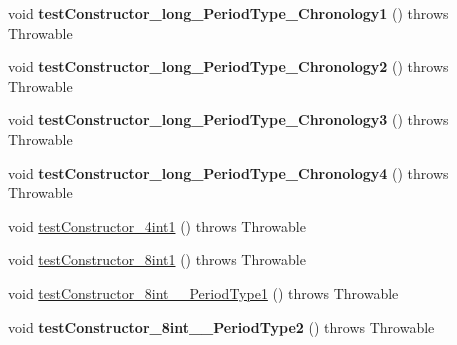 \begin{DoxyCompactItemize}
\item 
\hypertarget{classorg_1_1joda_1_1time_1_1_test_mutable_period___constructors_a5d15c2ef051da7a5cdbb56382c9f3d45}{void {\bfseries test\-Constructor\-\_\-long\-\_\-\-Period\-Type\-\_\-\-Chronology1} ()  throws Throwable }\label{classorg_1_1joda_1_1time_1_1_test_mutable_period___constructors_a5d15c2ef051da7a5cdbb56382c9f3d45}

\item 
\hypertarget{classorg_1_1joda_1_1time_1_1_test_mutable_period___constructors_a62b285c09e2b02371d8b730863ada50f}{void {\bfseries test\-Constructor\-\_\-long\-\_\-\-Period\-Type\-\_\-\-Chronology2} ()  throws Throwable }\label{classorg_1_1joda_1_1time_1_1_test_mutable_period___constructors_a62b285c09e2b02371d8b730863ada50f}

\item 
\hypertarget{classorg_1_1joda_1_1time_1_1_test_mutable_period___constructors_a1eec1e53a847981ecb0475cfd7804625}{void {\bfseries test\-Constructor\-\_\-long\-\_\-\-Period\-Type\-\_\-\-Chronology3} ()  throws Throwable }\label{classorg_1_1joda_1_1time_1_1_test_mutable_period___constructors_a1eec1e53a847981ecb0475cfd7804625}

\item 
\hypertarget{classorg_1_1joda_1_1time_1_1_test_mutable_period___constructors_aa4cb51db9744f4f75dd5b94e7d73677a}{void {\bfseries test\-Constructor\-\_\-long\-\_\-\-Period\-Type\-\_\-\-Chronology4} ()  throws Throwable }\label{classorg_1_1joda_1_1time_1_1_test_mutable_period___constructors_aa4cb51db9744f4f75dd5b94e7d73677a}

\item 
void \hyperlink{classorg_1_1joda_1_1time_1_1_test_mutable_period___constructors_aa418e6e6befbddaca8e7b61273fa60ff}{test\-Constructor\-\_\-4int1} ()  throws Throwable 
\item 
void \hyperlink{classorg_1_1joda_1_1time_1_1_test_mutable_period___constructors_a8d184229acedaf181cabcfb7a01bed33}{test\-Constructor\-\_\-8int1} ()  throws Throwable 
\item 
void \hyperlink{classorg_1_1joda_1_1time_1_1_test_mutable_period___constructors_ac735e3cad2b21bbd0205c582471da187}{test\-Constructor\-\_\-8int\-\_\-\-\_\-\-Period\-Type1} ()  throws Throwable 
\item 
\hypertarget{classorg_1_1joda_1_1time_1_1_test_mutable_period___constructors_a1b0e24275cffe261de87928dc2791695}{void {\bfseries test\-Constructor\-\_\-8int\-\_\-\-\_\-\-Period\-Type2} ()  throws Throwable }\label{classorg_1_1joda_1_1time_1_1_test_mutable_period___constructors_a1b0e24275cffe261de87928dc2791695}


\end{DoxyCompactItemize}
